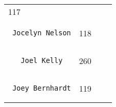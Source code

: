 \documentclass[]{article}
\begin{document}
\begin{longtable}[c]{@{}llll@{}}
\begin{minipage}[t]{0.10\columnwidth}
117
\end{minipage} & \begin{minipage}[t]{0.13\columnwidth}\raggedright
\end{minipage} & \begin{minipage}[t]{0.15\columnwidth}\raggedright
\end{minipage}
\\\noalign{\medskip}
\begin{minipage}[t]{0.39\columnwidth}\raggedright
\begin{verbatim}
 Jocelyn Nelson
\end{verbatim}
\end{minipage} & \begin{minipage}[t]{0.10\columnwidth}\raggedright
118
\end{minipage} & \begin{minipage}[t]{0.13\columnwidth}\raggedright
\end{minipage} & \begin{minipage}[t]{0.15\columnwidth}\raggedright
\end{minipage}
\\\noalign{\medskip}
\begin{minipage}[t]{0.39\columnwidth}\raggedright
\begin{verbatim}
   Joel Kelly
\end{verbatim}
\end{minipage} & \begin{minipage}[t]{0.10\columnwidth}\raggedright
260
\end{minipage} & \begin{minipage}[t]{0.13\columnwidth}\raggedright
\end{minipage} & \begin{minipage}[t]{0.15\columnwidth}\raggedright
\end{minipage}
\\\noalign{\medskip}
\begin{minipage}[t]{0.39\columnwidth}\raggedright
\begin{verbatim}
 Joey Bernhardt
\end{verbatim}
\end{minipage} & \begin{minipage}[t]{0.10\columnwidth}\raggedright
119
\end{minipage} & \begin{minipage}[t]{0.13\columnwidth}\raggedright
\end{minipage} & \begin{minipage}[t]{0.15\columnwidth}\raggedright

\end{minipage}
\end{longtable}
\end{document}
